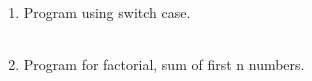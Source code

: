 \documentclass{exam}
\begin{document}
\begin{enumerate}
   \item  Program  using switch case.

   \begin{myTableStyle}
   \begin{center} \begin{tabular}{ |m{14cm}| } \hline
              \\ \hline
    \end{tabular} \end{center}
\end{myTableStyle}
  \pagebreak

   \item  Program  for factorial, sum of first n numbers.

   \begin{myTableStyle}
   \begin{center} \begin{tabular}{ |m{14cm}| } \hline
              \\ \hline
    \end{tabular} \end{center}
\end{myTableStyle}



  \end{enumerate}
\end{document}
